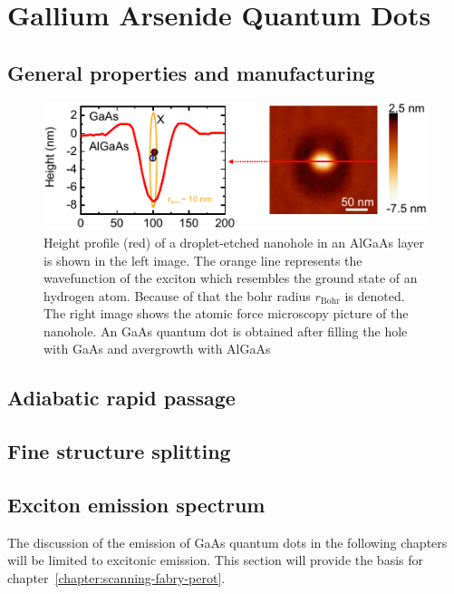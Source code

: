 \chapter{Gallium Arsenide Quantum Dots}
\label{chapter:quantum-dot}

\section{General properties and manufacturing}

\begin{figure}[H]
	\centering
	\includegraphics[width=0.9\linewidth]{figures/quantum-dot/QD_plot_AFM}
	\caption{Height profile (red) of a droplet-etched nanohole in an AlGaAs layer is shown in the left image.
	The orange line represents the wavefunction of the exciton which resembles the ground state of an hydrogen atom.
	Because of that the bohr radius $r_{\textrm{Bohr}}$ is denoted.
	The right image shows the atomic force microscopy picture of the nanohole.
	An GaAs quantum dot is obtained after filling the hole with GaAs and avergrowth with AlGaAs~\cite{reindl_highly_2019}}
	\label{fig:qdplotafm}
\end{figure}

\section{Adiabatic rapid passage}

\section{Fine structure splitting}


\section{Exciton emission spectrum}

The discussion of the emission of GaAs quantum dots in the following chapters will be limited to excitonic emission. 
This section will provide the basis for chapter~\ref{chapter:scanning-fabry-perot}.

